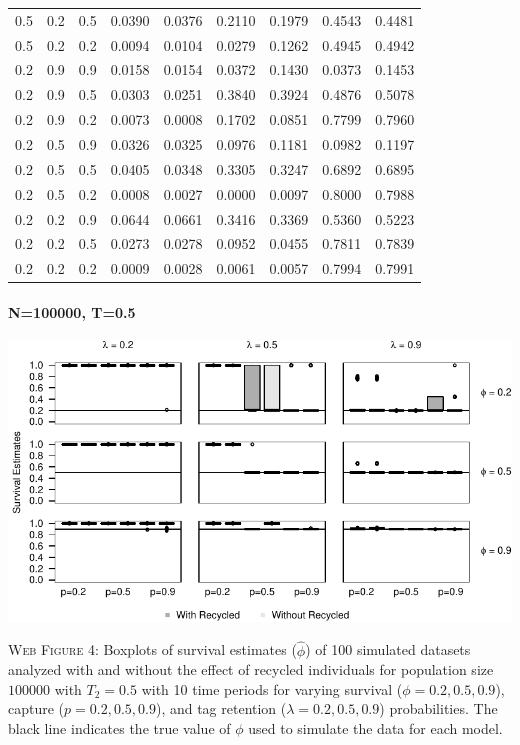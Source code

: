 \documentclass[]{article}
\let\oldparagraph\paragraph
\renewcommand{\paragraph}[1]{\oldparagraph{#1}\mbox{}}
\begin{document}
\begin{table}[ht]
{\begin{tabular}{rrrrrrrrr}
  0.5 & 0.2 & 0.5 & 0.0390 & 0.0376 & 0.2110 & 0.1979 & 0.4543 & 0.4481 \\ 
  0.5 & 0.2 & 0.2 & 0.0094 & 0.0104 & 0.0279 & 0.1262 & 0.4945 & 0.4942 \\ 
  0.2 & 0.9 & 0.9 & 0.0158 & 0.0154 & 0.0372 & 0.1430 & 0.0373 & 0.1453 \\ 
  0.2 & 0.9 & 0.5 & 0.0303 & 0.0251 & 0.3840 & 0.3924 & 0.4876 & 0.5078 \\ 
  0.2 & 0.9 & 0.2 & 0.0073 & 0.0008 & 0.1702 & 0.0851 & 0.7799 & 0.7960 \\ 
  0.2 & 0.5 & 0.9 & 0.0326 & 0.0325 & 0.0976 & 0.1181 & 0.0982 & 0.1197 \\ 
  0.2 & 0.5 & 0.5 & 0.0405 & 0.0348 & 0.3305 & 0.3247 & 0.6892 & 0.6895 \\ 
  0.2 & 0.5 & 0.2 & 0.0008 & 0.0027 & 0.0000 & 0.0097 & 0.8000 & 0.7988 \\ 
  0.2 & 0.2 & 0.9 & 0.0644 & 0.0661 & 0.3416 & 0.3369 & 0.5360 & 0.5223 \\ 
  0.2 & 0.2 & 0.5 & 0.0273 & 0.0278 & 0.0952 & 0.0455 & 0.7811 & 0.7839 \\ 
  0.2 & 0.2 & 0.2 & 0.0009 & 0.0028 & 0.0061 & 0.0057 & 0.7994 & 0.7991 \\ 
   \hline
\end{tabular}
}
\endgroup
\end{table}

\newpage

\paragraph{N=100000, T=0.5}\label{n100000-t0.5}

\includegraphics{Appendix_BW_files/figure-latex/figure4_survival_GJSTL3-1.pdf}

\textsc{Web Figure 4:} Boxplots of survival estimates (\(\hat{\phi}\))
of 100 simulated datasets analyzed with and without the effect of
recycled individuals for population size \(100000\) with \(T_2=0.5\)
with 10 time periods for varying survival (\(\phi=0.2,0.5,0.9\)),
capture (\(p=0.2,0.5,0.9\)), and tag retention (\(\lambda=0.2,0.5,0.9\))
probabilities. The black line indicates the true value of \(\phi\) used
to simulate the data for each model.
\end{document}
